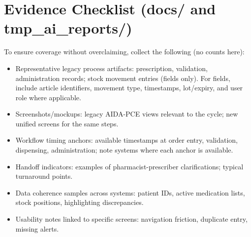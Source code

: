 \section{Evidence Checklist (docs/ and tmp\_ai\_reports/)}
To ensure coverage without overclaiming, collect the following (no counts here):
\begin{itemize}
    \item Representative legacy process artifacts: prescription, validation, administration records; stock movement entries (fields only). For fields, include article identifiers, movement type, timestamps, lot/expiry, and user role where applicable.
    \item Screenshots/mockups: legacy AIDA-PCE views relevant to the cycle; new unified screens for the same steps.
    \item Workflow timing anchors: available timestamps at order entry, validation, dispensing, administration; note systems where each anchor is available.
    \item Handoff indicators: examples of pharmacist-prescriber clarifications; typical turnaround points.
    \item Data coherence samples across systems: patient IDs, active medication lists, stock positions, highlighting discrepancies.
    \item Usability notes linked to specific screens: navigation friction, duplicate entry, missing alerts.
\end{itemize}

